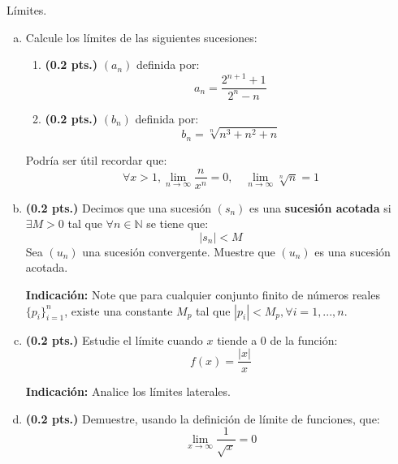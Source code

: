 \begin{problema}{Límites.}
	\begin{enumerate}[(a)]
		\item Calcule los límites de las siguientes sucesiones: 
		\begin{enumerate}
			\item \textbf{(0.2 pts.)} $(a_n)$ definida por: $$ a_n = \dfrac{2^{n+1} + 1}{2^n - n} $$ 
			
			\item \textbf{(0.2 pts.)} $(b_n)$ definida por: $$ b_n = \sqrt[n]{n^3 + n^2 + n} $$
		\end{enumerate}
		
		Podría ser útil recordar que: 
		$$ \forall x > 1, \lim_{n\rightarrow \infty } \dfrac{n}{x^n} = 0 , \quad \lim_{n\rightarrow \infty } \sqrt[n]{n} = 1 $$ 
		
		\item \textbf{(0.2 pts.)} Decimos que una sucesión $(s_n)$ es una \textbf{sucesión acotada} si $\exists M > 0$ tal que $\forall n \in \mathbb{N}$ se tiene que: 
		$$ | s_n | < M $$ 
		Sea $(u_n)$ una sucesión convergente. Muestre que $(u_n)$ es una sucesión acotada. 
		
		\textbf{Indicación:} Note que para cualquier conjunto finito de números reales $\{p_i\}_{i=1}^n$, existe una constante $M_p$ tal que $|p_i | < M_p, \forall i = 1, ... , n$. 
		
		\item \textbf{(0.2 pts.)} Estudie el límite cuando $x$ tiende a $0$ de la función: 
		$$ f(x) = \dfrac{|x|}{x} $$ 
		
		\textbf{Indicación:} Analice los límites laterales. 
		
		\item \textbf{(0.2 pts.)} Demuestre, usando la definición de límite de funciones, que: 
		$$ \lim_{x \rightarrow \infty} \dfrac{1}{\sqrt{x}} = 0 $$ 
	\end{enumerate}
\end{problema}

